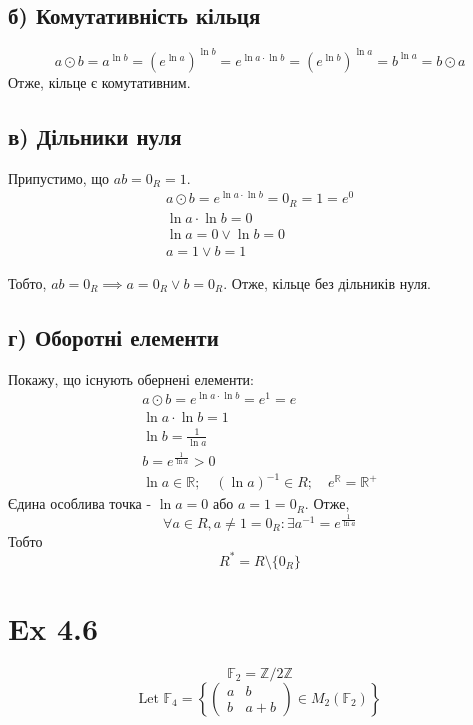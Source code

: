\documentclass[11pt, a4paper]{article} %
\newcommand{\R}{\mathbb{R}}
\newcommand{\Z}{\mathbb{Z}}
\newcommand{\F}{\mathbb{F}}
\begin{document}
\subsection*{б) Комутативність кільця}
\[a \odot b = a^{\ln b} = \left(e^{\ln a}\right)^{\ln b} = e^{\ln a \cdot \ln b} = \left(e^{\ln b}\right)^{\ln a} = b^{\ln a} = b \odot a\]
Отже, кільце є комутативним.

\subsection*{в) Дільники нуля}
Припустимо, що $ab = 0_R = 1$.
\begin{gather*}
    a\odot b = e^{\ln a \cdot \ln b} = 0_R = 1 = e^{0}\\
    \ln a \cdot \ln b = 0\\
    \ln a = 0 \vee \ln b = 0\\
    a = 1 \vee b = 1
\end{gather*}

Тобто, $ab=0_R \implies a=0_R \vee b=0_R$. Отже, кільце без дільників нуля.

\subsection*{г) Оборотні елементи}
Покажу, що існують обернені елементи:
\begin{gather*}
    a\odot b = e^{\ln a \cdot \ln b} = e^{1} = e\\
    \ln a \cdot \ln b = 1\\
    \ln b = \frac{1}{\ln a}\\
    b = e^{\frac{1}{\ln a}} > 0\\
    \ln a \in \R; \quad (\ln a)^{-1} \in R; \quad e^{\R} = \R^+
\end{gather*}
Єдина особлива точка - $\ln a = 0$ або $a = 1 = 0_R$.
Отже, 
\[\forall a\in R, a\ne 1=0_R: \exists a^{-1} = e^{\frac{1}{\ln a}}\]
Тобто
\[R^* = R\setminus \{0_R\}\]

\section*{Ex 4.6}
\begin{mdframed}
    \[\F_2 = \Z/2\Z\]
    \[\text{Let } \F_4 = \left\{\begin{pmatrix}
        a & b \\ b & a+b
    \end{pmatrix}\in M_2(\F_2)\right\}\]
\end{mdframed}
\end{document}
